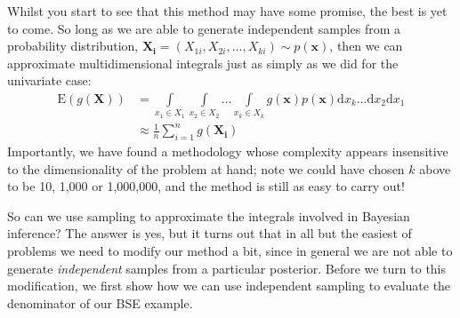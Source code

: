 \documentclass[11pt,fullpage]{book}
\begin{document}
Whilst you start to see that this method may have some promise, the best is yet to come. So long as we are able to generate independent samples from a probability distribution, $\boldsymbol{X_i}=(X_{1i},X_{2i},...,X_{ki})\sim p(\boldsymbol{x})$, then we can approximate multidimensional integrals just as simply as we did for the univariate case:
%
\begin{equation}
\begin{align}
\mathrm{E}(g(\boldsymbol{X})) &= \int\limits_{x_1\in X_1}\int\limits_{x_2\in X_2}...\int\limits_{x_{k}\in X_{k}} g(\boldsymbol{x}) p(\boldsymbol{x}) \mathrm{d}x_{k} ... \mathrm{d}x_{2}\mathrm{d}x_{1}\\
&\approx \frac{1}{n} \sum\limits_{i=1}^{n} g(\boldsymbol{X_i})
\end{align}
\end{equation}
%
Importantly, we have found a methodology whose complexity appears insensitive to the dimensionality of the problem at hand; note we could have chosen $k$ above to be 10, 1,000 or 1,000,000, and the method is still as easy to carry out!

So can we use sampling to approximate the integrals involved in Bayesian inference? The answer is yes, but it turns out that in all but the easiest of problems we need to modify our method a bit, since in general we are not able to generate \textit{independent} samples from a particular posterior. Before we turn to this modification, we first show how we can use independent sampling to evaluate the denominator of our BSE example.
\end{document}
